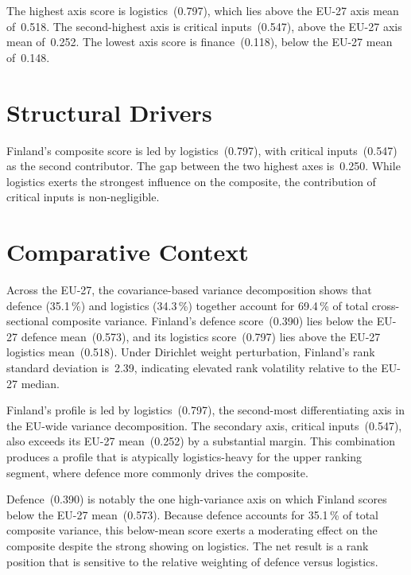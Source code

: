 \documentclass[12pt,a4paper]{article}
\begin{document}
The highest axis score is logistics~(0.797), which lies above the EU-27 axis mean of~0.518.  The second-highest axis is critical inputs~(0.547), above the EU-27 axis mean of~0.252.  The lowest axis score is finance~(0.118), below the EU-27 mean of~0.148.


\section{Structural Drivers}
\label{sec:drivers}

\begin{sloppypar}
Finland's composite score is led by logistics~(0.797), with critical inputs~(0.547) as the second contributor.  The gap between the two highest axes is~0.250.  While logistics exerts the strongest influence on the composite, the contribution of critical inputs is non-negligible.
\end{sloppypar}


\section{Comparative Context}
\label{sec:comparative}

Across the EU-27, the covariance-based variance decomposition shows that defence (35.1\,\%) and logistics (34.3\,\%) together account for 69.4\,\% of total cross-sectional composite variance.  Finland's defence score~(0.390) lies below the EU-27 defence mean~(0.573), and its logistics score~(0.797) lies above the EU-27 logistics mean~(0.518).  Under Dirichlet weight perturbation, Finland's rank standard deviation is~2.39, indicating elevated rank volatility relative to the EU-27 median.



Finland's profile is led by logistics~(0.797), the second-most differentiating axis in the EU-wide variance decomposition.  The secondary axis, critical inputs~(0.547), also exceeds its EU-27 mean~(0.252) by a substantial margin.  This combination produces a profile that is atypically logistics-heavy for the upper ranking segment, where defence more commonly drives the composite.

Defence~(0.390) is notably the one high-variance axis on which Finland scores below the EU-27 mean~(0.573).  Because defence accounts for 35.1\,\% of total composite variance, this below-mean score exerts a moderating effect on the composite despite the strong showing on logistics.  The net result is a rank position that is sensitive to the relative weighting of defence versus logistics.
\end{document}
